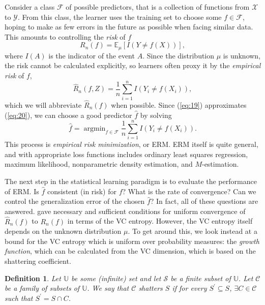 \documentclass[11pt]{article}
\newtheorem{definition}[theorem]{Definition}
\newcommand{\F}{\mathcal{F}}
\newcommand{\E}{\mathbb{E}}
\renewcommand{\eqref}[1]{(\ref{eq:#1})}
\DeclareMathOperator*{\argmin}{argmin}
\renewcommand{\hat}[1]{\widehat{#1}}
\begin{document}
Consider a class $\F$ of possible predictors, that is a collection of functions
from $\mathcal{X}$ to $\mathcal{Y}$. From this class, the learner uses the
training set to choose some $f \in \F$, hoping to make as few errors in the
future as possible when facing similar data. This amounts to controlling the
\emph{risk} of $f$
\begin{equation}
  \label{eq:20}
  R_n(f) = \E_\mu[ I(Y \neq f(X))],
\end{equation}
where $I(A)$ is the indicator of the event $A$.  Since the distribution $\mu$
is unknown, the risk cannot be calculated explicitly, so learners often proxy
it by the \emph{empirical risk} of $f$,
\begin{equation}
  \label{eq:19}
  \widehat{R}_n(f,Z) = \frac{1}{n} \sum_{i=1}^n I(Y_i \neq f(X_i)),
\end{equation}
which we will abbreviate $\hat{R}_n(f)$ when possible.  Since \eqref{19}
approximates \eqref{20}, we can choose a good predictor $\hat{f}$ by solving
\begin{equation*}
  \label{eq:21}
  \hat{f} = \argmin_{f \in \F} \frac{1}{n} \sum_{i=1}^n I(Y_i \neq f(X_i)).
\end{equation*}
This process is \emph{empirical risk minimization}, or ERM.  ERM itself is
quite general, and with appropriate loss functions includes ordinary least
squares regression, maximum likelihood, nonparametric density estimation, and
$M$-estimation.

The next step in the statistical learning paradigm is to evaluate the
performance of ERM. Is $\hat{f}$ consistent (in risk) for $f$? What is the rate
of convergence? Can we control the generalization error of the chosen
$\hat{f}$?  In fact, all of these questions are
answered. \citet{VapnikChervonenkis1991} gave necessary and sufficient
conditions for uniform convergence of $\hat{R}_n(f)$ to $R_n(f)$ in terms of
the VC entropy.  However, the VC entropy itself depends on the unknown
distribution $\mu$.  To get around this, we look instead at a bound for the VC
entropy which is uniform over probability measures: the \emph{growth function},
which can be calculated from the VC dimension, which is based on the shattering
coefficient.

\begin{definition}
  Let $\mathbb{U}$ be some (infinite) set and let $\mathcal{S}$ be a finite
  subset of $\mathbb{U}$. Let $\mathcal{C}$ be a family of subsets of
  $\mathbb{U}$. We say that $\mathcal{C}$ shatters $S$ if for every $S^{\prime}
  \subseteq S$, $\exists C \in\mathcal{C}$ such that $S^{\prime} = S \cap C$.
\end{definition}
\end{document}
